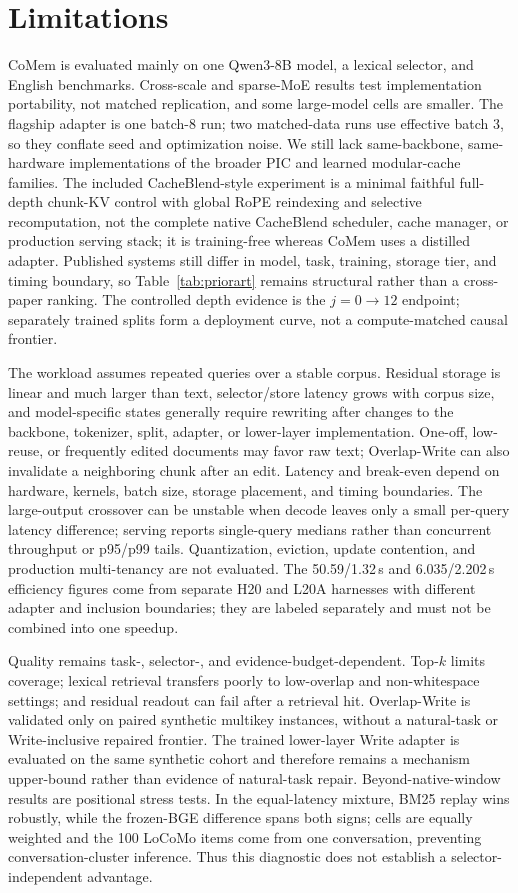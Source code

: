 \section*{Limitations}

CoMem is evaluated mainly on one Qwen3-8B model, a lexical selector, and English
benchmarks. Cross-scale and sparse-MoE results test implementation portability,
not matched replication, and some large-model cells are smaller. The flagship
adapter is one batch-8 run; two matched-data runs use effective batch 3, so they
conflate seed and optimization noise. We still lack same-backbone,
same-hardware implementations of the broader PIC and learned modular-cache
families. The included CacheBlend-style experiment is a minimal faithful
full-depth chunk-KV control with global RoPE reindexing and selective
recomputation, not the complete native CacheBlend scheduler, cache manager, or
production serving stack; it is training-free whereas CoMem uses a distilled
adapter. Published systems still differ in model, task, training, storage tier,
and timing boundary, so Table~\ref{tab:priorart} remains structural rather than
a cross-paper ranking. The controlled depth evidence is the
$j{=}0\!\rightarrow\!12$ endpoint; separately trained splits form a deployment
curve, not a compute-matched causal frontier.

The workload assumes repeated queries over a stable corpus. Residual storage is
linear and much larger than text, selector/store latency grows with corpus size,
and model-specific states generally require rewriting after changes to the
backbone, tokenizer, split, adapter, or lower-layer implementation. One-off,
low-reuse, or frequently edited documents may favor raw text; Overlap-Write can
also invalidate a neighboring chunk after an edit. Latency and break-even depend
on hardware, kernels, batch size, storage placement, and timing boundaries. The
large-output crossover can be unstable when decode leaves only a small
per-query latency difference; serving reports single-query medians rather than
concurrent throughput or p95/p99 tails. Quantization,
eviction, update contention, and production multi-tenancy are not evaluated.
The 50.59/1.32\,s and 6.035/2.202\,s efficiency figures come from separate H20
and L20A harnesses with different adapter and inclusion boundaries; they are
labeled separately and must not be combined into one speedup.

Quality remains task-, selector-, and evidence-budget-dependent. Top-$k$ limits
coverage; lexical retrieval transfers poorly to low-overlap and non-whitespace
settings; and residual readout can fail after a retrieval hit. Overlap-Write is
validated only on paired synthetic multikey instances, without a natural-task or
Write-inclusive repaired frontier. The trained lower-layer Write adapter is
evaluated on the same synthetic cohort and therefore remains a mechanism
upper-bound rather than evidence of natural-task repair. Beyond-native-window results are positional
stress tests. In the equal-latency mixture, BM25 replay wins robustly, while the
frozen-BGE difference spans both signs; cells are equally weighted and the 100
LoCoMo items come from one conversation, preventing conversation-cluster
inference. Thus this diagnostic does not establish a selector-independent
advantage.

